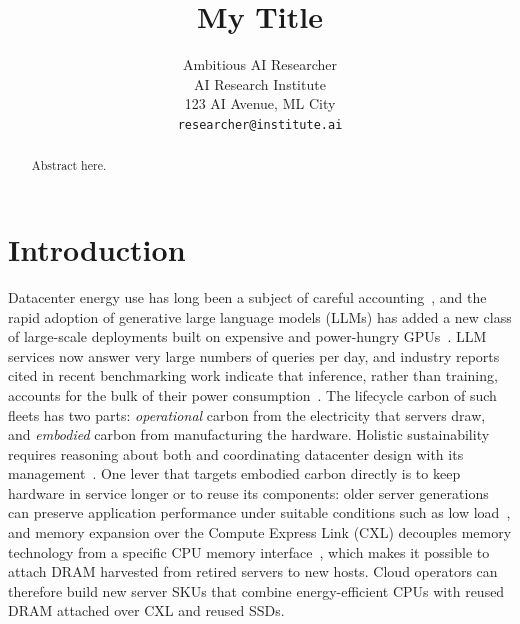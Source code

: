 \documentclass{article} %
\title{My Title}
\author{Ambitious AI Researcher\\
AI Research Institute\\
123 AI Avenue, ML City\\
\texttt{researcher@institute.ai}
}
\begin{document}
\maketitle

\begin{abstract}
Abstract here.
\end{abstract}

\section{Introduction}
\label{sec:intro}
Datacenter energy use has long been a subject of careful accounting~\citep{Masanet2020RecalibratingGlobal}, and the rapid adoption of generative large language models (LLMs) has added a new class of large-scale deployments built on expensive and power-hungry GPUs~\citep{Patel2023SplitwiseEfficient}. LLM services now answer very large numbers of queries per day, and industry reports cited in recent benchmarking work indicate that inference, rather than training, accounts for the bulk of their power consumption~\citep{Niu2026TokenpowerbenchBenchmarking}. The lifecycle carbon of such fleets has two parts: \emph{operational} carbon from the electricity that servers draw, and \emph{embodied} carbon from manufacturing the hardware. Holistic sustainability requires reasoning about both and coordinating datacenter design with its management~\citep{Acun2023CarbonDependencies}. One lever that targets embodied carbon directly is to keep hardware in service longer or to reuse its components: older server generations can preserve application performance under suitable conditions such as low load~\citep{Wang2023PeelingBack}, and memory expansion over the Compute Express Link (CXL) decouples memory technology from a specific CPU memory interface~\citep{Sun2023DemystifyingCxl,Sharma2024IntroductionCompute}, which makes it possible to attach DRAM harvested from retired servers to new hosts. Cloud operators can therefore build new server SKUs that combine energy-efficient CPUs with reused DRAM attached over CXL and reused SSDs.
\end{document}
